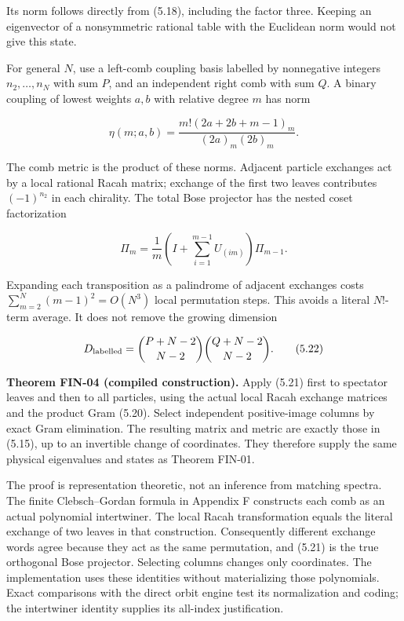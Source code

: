 \documentclass[a4paper,11pt]{article}
\numberwithin{equation}{section}
\begin{document}
Its norm follows directly from (5.18), including the factor three. Keeping an eigenvector of a nonsymmetric rational table with the Euclidean norm would not give this state.

For general \(N\), use a left-comb coupling basis labelled by nonnegative integers \(n_2,\ldots,n_N\) with sum \(P\), and an independent right comb with sum \(Q\). A binary coupling of lowest weights \(a,b\) with relative degree \(m\) has norm

\[
\eta(m;a,b)=\frac{m!(2a+2b+m-1)_m}{(2a)_m(2b)_m}.
\tag{5.20}
\]

The comb metric is the product of these norms. Adjacent particle exchanges act by a local rational Racah matrix; exchange of the first two leaves contributes \((-1)^{n_2}\) in each chirality. The total Bose projector has the nested coset factorization

\[
\Pi_m=\frac1m\left(I+\sum_{i=1}^{m-1}U_{(im)}\right)\Pi_{m-1}.
\tag{5.21}
\]

Expanding each transposition as a palindrome of adjacent exchanges costs \(\sum_{m=2}^N(m-1)^2=O(N^3)\) local permutation steps. This avoids a literal \(N!\)-term average. It does not remove the growing dimension

\[
D_{\rm labelled}=\binom{P+N-2}{N-2}\binom{Q+N-2}{N-2}.
\tag{5.22}
\]

\textbf{Theorem FIN-04 (compiled construction).} Apply (5.21) first to spectator leaves and then to all particles, using the actual local Racah exchange matrices and the product Gram (5.20). Select independent positive-image columns by exact Gram elimination. The resulting matrix and metric are exactly those in (5.15), up to an invertible change of coordinates. They therefore supply the same physical eigenvalues and states as Theorem FIN-01.

The proof is representation theoretic, not an inference from matching spectra. The finite Clebsch--Gordan formula in Appendix F constructs each comb as an actual polynomial intertwiner. The local Racah transformation equals the literal exchange of two leaves in that construction. Consequently different exchange words agree because they act as the same permutation, and (5.21) is the true orthogonal Bose projector. Selecting columns changes only coordinates. The implementation uses these identities without materializing those polynomials. Exact comparisons with the direct orbit engine test its normalization and coding; the intertwiner identity supplies its all-index justification.
\end{document}
